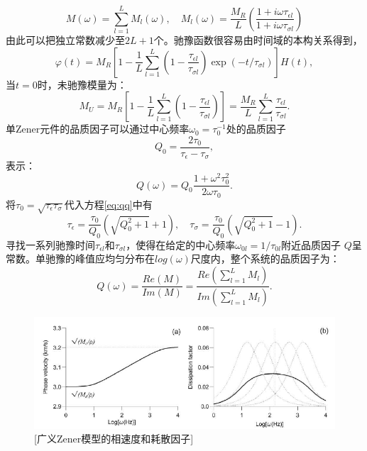 \begin{equation}
	M(\omega)=\sum_{l=1}^{L}M_l(\omega), \quad M_l(\omega)=\frac{M_R}{L}
	(\frac{1+i\omega\tau_{\epsilon l}}{1+i\omega\tau_{\sigma l}})
\end{equation}
由此可以把独立常数减少至$2L+1$个。驰豫函数很容易由时间域的本构关系得到，
\begin{equation}
	\varphi(t)=M_R[1-\frac{1}{L}\sum_{l=1}^{L}(1-\frac{\tau_{\epsilon l}}{\tau_{\sigma l}})
	\exp(-t/\tau_{\sigma l})]H(t),
\end{equation}
当$t=0$时，未驰豫模量为：
\begin{equation}
	M_U=M_R[1-\frac{1}{L}\sum_{l=1}^{L}(1-\frac{\tau_{\epsilon l}}{\tau_{\sigma l}})]
	=\frac{M_R}{L}\sum_{l=1}^{L}\frac{\tau_{\epsilon l}}{\tau_{\sigma l}}.
\end{equation}
单Zener元件的品质因子可以通过中心频率$\omega_0=\tau_0^{-1}$处的品质因子
\begin{equation}
	Q_0=\frac{2\tau_0}{\tau_\epsilon-\tau_\sigma},
	\label{eq:qq}
\end{equation}
表示：
\begin{equation}
	Q(\omega)=Q_0\frac{1+\omega^2\tau_0^2}{2\omega\tau_0}.
\end{equation}
将$\tau_0=\sqrt{\tau_\epsilon\tau_\sigma}$代入方程\ref{eq:qq}中有
\begin{equation}
	\tau_\epsilon=\frac{\tau_0}{Q_0}(\sqrt{Q_0^2+1}+1), \quad \tau_\sigma=\frac{\tau_0}{Q_0}(\sqrt{Q_0^2+1}-1).
\end{equation}
寻找一系列驰豫时间$\tau_{\epsilon l}$和$\tau_{\sigma l}$，使得在给定的中心频率$\omega_{0l}=1/\tau_{0l}$附近品质因子
$Q$呈常数。单驰豫的峰值应均匀分布在$log(\omega)$尺度内，整个系统的品质因子为：
\begin{equation}
	Q(\omega)=\frac{Re(M)}{Im(M)}=\frac{Re(\sum_{l=1}^{L}M_l)}{Im(\sum_{l=1}^{L}M_l)}.
\end{equation}
\begin{figure}[!htbp]
	    \centering
		\includegraphics[width=0.8\linewidth]{figure/zener_vp}
		[广义Zener模型的相速度和耗散因子]
		\label{fig:zener_vp}
\end{figure}
